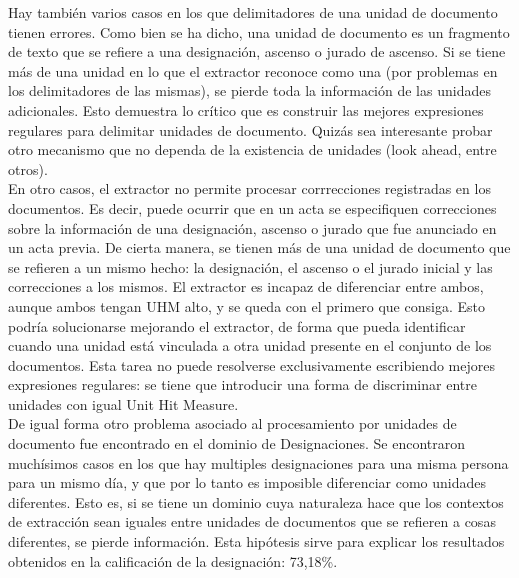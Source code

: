 Hay también varios casos en los que delimitadores de una unidad de documento tienen errores. Como bien se ha dicho, una unidad de documento es un fragmento de texto que se refiere a una designación, ascenso o jurado de ascenso. Si se tiene más de una unidad en lo que el extractor reconoce como una (por problemas en los delimitadores de las mismas), se pierde toda la información de las unidades adicionales. Esto demuestra lo crítico que es construir las mejores expresiones regulares para delimitar unidades de documento. Quizás sea interesante probar otro mecanismo que no dependa de la existencia de unidades (look ahead, entre otros).  \\

En otro casos, el extractor no permite procesar corrrecciones registradas en los documentos. Es decir, puede ocurrir que en un acta se especifiquen correcciones sobre la información de una designación, ascenso o jurado que fue anunciado en un acta previa. De cierta manera, se tienen más de una unidad de documento que se refieren a un mismo hecho: la designación, el ascenso o el jurado inicial y las correcciones a los mismos. El extractor es incapaz de diferenciar entre ambos, aunque ambos tengan UHM alto, y se queda con el primero que consiga. Esto podría solucionarse mejorando el extractor, de forma que pueda identificar cuando una unidad está vinculada a otra unidad presente en el conjunto de los documentos. Esta tarea no puede resolverse exclusivamente escribiendo mejores expresiones regulares: se tiene que introducir una forma de discriminar entre unidades con igual Unit Hit Measure.\\

De igual forma otro problema asociado al procesamiento por unidades de documento fue encontrado en el dominio de Designaciones. Se encontraron muchísimos casos en los que hay multiples designaciones para una misma persona para un mismo día, y que por lo tanto es imposible diferenciar como unidades diferentes. Esto es, si se tiene un dominio cuya naturaleza hace que los contextos de extracción sean iguales entre unidades de documentos que se refieren a cosas diferentes, se pierde información. Esta hipótesis sirve para explicar los resultados obtenidos en la calificación de la designación: 73,18\%. \\

